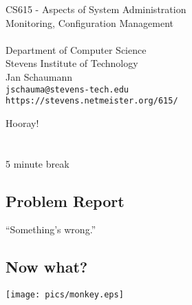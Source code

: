 \documentclass[xga]{xdvislides}
\begin{document}
\setfontphv

\lhead{\slidetitle}                               %
\cfoot{\relax}                               %
\rfoot{\Gray{\today}}

\newcommand{\smallish}{\fontsize{16}{16}\selectfont}

\vspace*{\fill}
\begin{center}
	\Hugesize
		CS615 - Aspects of System Administration\\ [1em]
		Monitoring, Configuration Management\\ [1em]
	\hspace*{5mm}\blueline\\ [1em]
	\Normalsize
		Department of Computer Science\\
		Stevens Institute of Technology\\
		Jan Schaumann\\
		\verb+jschauma@stevens-tech.edu+ \\
		\verb+https://stevens.netmeister.org/615/+
\end{center}
\vspace*{\fill}

\newpage
\vspace*{\fill}
\begin{center}
	\Hugesize
		Hooray!\\ [1em]
	\hspace*{5mm}
	\blueline\\
	\hspace*{5mm}\\
		5 minute break
\end{center}
\vspace*{\fill}


\subsection{Problem Report}
\vspace*{\fill}
\Huge
\begin{center}
``Something's wrong.''
\end{center}
\Normalsize
\vspace*{\fill}

\subsection{Now what?}
\begin{center}
	\texttt{[image: pics/monkey.eps]}
\end{center}
\end{document}
